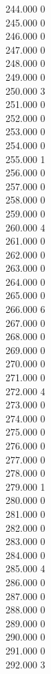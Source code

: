 { 244.000	0 \\
 245.000	0 \\
 246.000	0 \\
 247.000	0 \\
 248.000	0 \\
 249.000	0 \\
 250.000	3 \\
 251.000	0 \\
 252.000	0 \\
 253.000	0 \\
 254.000	0 \\
 255.000	1 \\
 256.000	0 \\
 257.000	0 \\
 258.000	0 \\
 259.000	0 \\
 260.000	4 \\
 261.000	0 \\
 262.000	0 \\
 263.000	0 \\
 264.000	0 \\
 265.000	0 \\
 266.000	6 \\
 267.000	0 \\
 268.000	0 \\
 269.000	0 \\
 270.000	0 \\
 271.000	0 \\
 272.000	4 \\
 273.000	0 \\
 274.000	0 \\
 275.000	0 \\
 276.000	0 \\
 277.000	0 \\
 278.000	0 \\
 279.000	1 \\
 280.000	0 \\
 281.000	0 \\
 282.000	0 \\
 283.000	0 \\
 284.000	0 \\
 285.000	4 \\
 286.000	0 \\
 287.000	0 \\
 288.000	0 \\
 289.000	0 \\
 290.000	0 \\
 291.000	0 \\
 292.000	3 \\
}
